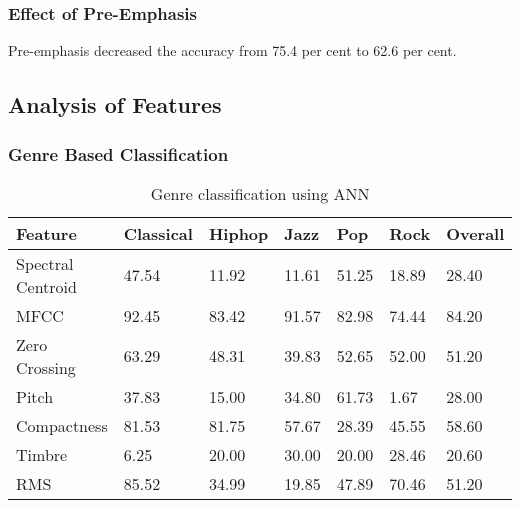 \subsubsection{Effect of Pre-Emphasis}
Pre-emphasis decreased the accuracy from 75.4 per cent to 62.6 per cent.

\newpage
\subsection{Analysis of Features}
\subsubsection{Genre Based Classification}
\begin{table}[h!]
        \caption{Genre classification using ANN}
        \begin{center}
                \begin{tabular}{|l|l|l|l|l|l|l|}
                        \hline Feature & Classical & Hiphop & Jazz & Pop & Rock & Overall\\
                        \hline Spectral Centroid & 47.54 & 11.92 & 11.61 & 51.25 & 18.89 & 28.40\\ 
                        \hline MFCC & 92.45 & 83.42 & 91.57 & 82.98 & 74.44 & 84.20 \\
                        \hline Zero Crossing & 63.29 & 48.31 & 39.83 & 52.65 & 52.00 & 51.20\\
                        \hline Pitch & 37.83 & 15.00 & 34.80 & 61.73 & 1.67 & 28.00\\
                        \hline Compactness & 81.53 & 81.75 & 57.67 & 28.39 & 45.55 & 58.60\\
                        \hline Timbre&
                        6.25
                        &
                        20.00
                        &
                        30.00
                        &
                        20.00
                        &
                        28.46
                        &
                        20.60
                        \\
                        \hline RMS&

                        85.52
                        &
                        34.99
                        &
                        19.85
                        &
                        47.89
                        &
                        70.46
                        &
                        51.20
                        \\


\end{tabular}
\end{center}
\end{table}
